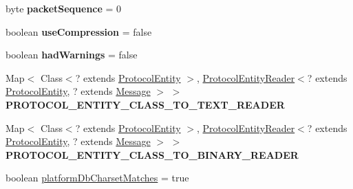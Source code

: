 \begin{DoxyCompactItemize}
\item 
\mbox{\label{classcom_1_1mysql_1_1cj_1_1protocol_1_1a_1_1_native_protocol_a102da65acee58a628e60310293623fb7}} 
byte {\bfseries packet\+Sequence} = 0
\item 
\mbox{\label{classcom_1_1mysql_1_1cj_1_1protocol_1_1a_1_1_native_protocol_af6bd84239db260ea265898450bbc9e39}} 
boolean {\bfseries use\+Compression} = false
\item 
\mbox{\label{classcom_1_1mysql_1_1cj_1_1protocol_1_1a_1_1_native_protocol_a6cb2c60a1acd72e99a1a40b162947c08}} 
boolean {\bfseries had\+Warnings} = false
\item 
\mbox{\label{classcom_1_1mysql_1_1cj_1_1protocol_1_1a_1_1_native_protocol_a622186feee8d445793f13a016b877f5c}} 
Map$<$ Class$<$? extends \mbox{\hyperlink{interfacecom_1_1mysql_1_1cj_1_1protocol_1_1_protocol_entity}{Protocol\+Entity}} $>$, \mbox{\hyperlink{interfacecom_1_1mysql_1_1cj_1_1protocol_1_1_protocol_entity_reader}{Protocol\+Entity\+Reader}}$<$? extends \mbox{\hyperlink{interfacecom_1_1mysql_1_1cj_1_1protocol_1_1_protocol_entity}{Protocol\+Entity}}, ? extends \mbox{\hyperlink{interfacecom_1_1mysql_1_1cj_1_1protocol_1_1_message}{Message}} $>$ $>$ {\bfseries P\+R\+O\+T\+O\+C\+O\+L\+\_\+\+E\+N\+T\+I\+T\+Y\+\_\+\+C\+L\+A\+S\+S\+\_\+\+T\+O\+\_\+\+T\+E\+X\+T\+\_\+\+R\+E\+A\+D\+ER}
\item 
\mbox{\label{classcom_1_1mysql_1_1cj_1_1protocol_1_1a_1_1_native_protocol_a7a0bae11d1173c65e19e4a20904fd60b}} 
Map$<$ Class$<$? extends \mbox{\hyperlink{interfacecom_1_1mysql_1_1cj_1_1protocol_1_1_protocol_entity}{Protocol\+Entity}} $>$, \mbox{\hyperlink{interfacecom_1_1mysql_1_1cj_1_1protocol_1_1_protocol_entity_reader}{Protocol\+Entity\+Reader}}$<$? extends \mbox{\hyperlink{interfacecom_1_1mysql_1_1cj_1_1protocol_1_1_protocol_entity}{Protocol\+Entity}}, ? extends \mbox{\hyperlink{interfacecom_1_1mysql_1_1cj_1_1protocol_1_1_message}{Message}} $>$ $>$ {\bfseries P\+R\+O\+T\+O\+C\+O\+L\+\_\+\+E\+N\+T\+I\+T\+Y\+\_\+\+C\+L\+A\+S\+S\+\_\+\+T\+O\+\_\+\+B\+I\+N\+A\+R\+Y\+\_\+\+R\+E\+A\+D\+ER}
\item 
boolean \mbox{\hyperlink{classcom_1_1mysql_1_1cj_1_1protocol_1_1a_1_1_native_protocol_af023799e47c29f6821440c5b60fba820}{platform\+Db\+Charset\+Matches}} = true
\end{DoxyCompactItemize}
